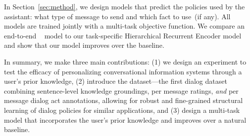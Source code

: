 In Section~\ref{sec:method}, we design models that predict the policies used by the assistant: what type of message to send and which fact to use~(if any).
All models are trained jointly with a multi-task objective function.
We compare an end-to-end \bert{}~\citep{Devlin2018BERTPO} model to our task-specific Hierarchical Recurrent Encoder model~\citep{Serban2015BuildingED} and show that our model improves over the baseline.

In summary, we make three main contributions: (1) we design an experiment to test the efficacy of personalizing conversational information systems through a user's prior knowledge,  (2) introduce the \rover{} dataset---the first dialog dataset combining sentence-level knowledge groundings, per message ratings, \emph{and} per message dialog act annotations, allowing for robust and fine-grained structural learning of dialog policies for similar applications, and (3) design a multi-task model that incorporates the user's prior knowledge and improves over a natural \bert{} baseline.
